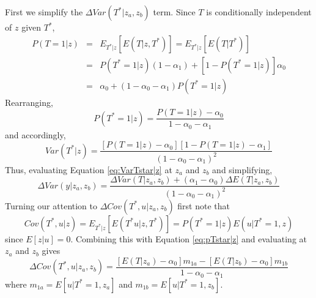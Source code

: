 First we simplify the $\Delta Var(T^*|z_a,z_b)$ term.
Since $T$ is conditionally independent of $z$ given $T^*$, 
\begin{eqnarray*}
  P(T=1|z) &=& E_{T^*|z}\left[E\left( T|z,T^* \right)  \right] = E_{T^*|z}\left[E\left( T|T^* \right)  \right]\\
  &=&  P\left( T^* = 1 | z \right) \left( 1-\alpha_1 \right) + \left[ 1 - P\left( T^*=1|z \right) \right] \alpha_0\\
  &=& \alpha_0 + \left( 1 - \alpha_0 - \alpha_1 \right) P(T^*=1|z)
\end{eqnarray*}
Rearranging,
\begin{equation}
  P(T^*=1|z) = \frac{P(T=1|z) - \alpha_0}{1 - \alpha_0 - \alpha_1}
  \label{eq:pTstar|z}
\end{equation}
and accordingly,
\begin{equation}
  Var(T^*|z) = \frac{\left[ P\left( T=1|z \right) - \alpha_0 \right]\left[ 1 - P\left( T=1|z \right) - \alpha_1 \right]}{\left( 1 - \alpha_0 - \alpha_1 \right)^2}
  \label{eq:VarTstar|z}
\end{equation}
Thus, evaluating Equation \ref{eq:VarTstar|z} at $z_a$ and $z_b$ and simplifying,
\begin{equation}
  \Delta Var(y|z_a,z_b) = \frac{\Delta Var(T|z_a,z_b) + \left( \alpha_1 - \alpha_0 \right) \Delta E(T|z_a, z_b) }{\left( 1 - \alpha_0 - \alpha_1 \right)^2}
  \label{eq:vardiffTstar}
\end{equation}
Turning our attention to $\Delta Cov(T^*,u|z_a,z_b)$ first note that
\begin{equation}
  Cov(T^*,u|z) = E_{T^*|z}\left[E\left( T^*u|z,T^* \right)  \right] = P(T^*=1|z)E\left( u|T^*=1,z \right) 
  \label{eq:covTstaru}
\end{equation}
since $E[z|u] = 0$.
Combining this with Equation \ref{eq:pTstar|z} and evaluating at $z_a$ and $z_b$ gives
\begin{equation}
  \Delta Cov(T^*,u|z_a,z_b) = \frac{\left[E\left( T|z_a \right) - \alpha_0\right] m_{1a} - \left[ E(T|z_b) - \alpha_0 \right] m_{1b} }{1 - \alpha_0 - \alpha_1}
  \label{eq:diffCovTstaru}
\end{equation}
where $m_{1a} = E\left[ u|T^*=1,z_a \right]$ and $m_{1b} = E[u|T^*=1,z_b]$.

